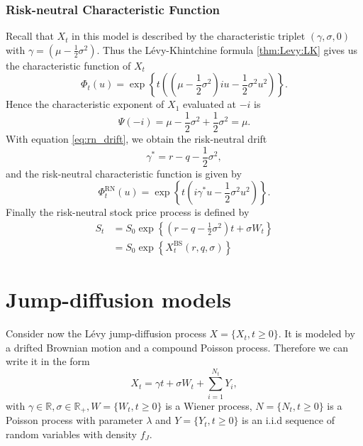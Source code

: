 \subsubsection*{Risk-neutral Characteristic Function}
Recall that $X_t$ in this model is described by the characteristic triplet $(\gamma, \sigma, 0)$ with $\gamma=\left(\mu-\frac{1}{2}\sigma^2\right)$. Thus the L\'evy-Khintchine formula \ref{thm:Levy:LK} gives us the characteristic function of $X_t$
$$\Phi_t(u)= \exp\left\{t\left(\left(\mu-\frac{1}{2}\sigma^2\right)iu -\frac{1}{2}\sigma^2 u^2\right)\right\}.$$
Hence the characteristic exponent of $X_1$ evaluated at $-i$ is
$$ \Psi(-i) = \mu -\frac{1}{2}\sigma^2+\frac{1}{2}\sigma^2 =\mu .$$
With equation \eqref{eq:rn_drift}, we obtain the risk-neutral drift
$$\gamma^\ast = r-q-\frac{1}{2}\sigma^2,$$
and the risk-neutral characteristic function is given by
$$\Phi_t^{\text{RN}}(u) = \exp\left\{t\left(i\gamma^\ast u -\frac{1}{2}\sigma^2u^2\right)\right\}.$$
Finally the risk-neutral stock price process is defined by
\begin{align*}
S_t&=S_0\exp\left\{\left(r-q-\frac{1}{2}\sigma^2\right)t+\sigma W_t\right\}\\
&=S_0\exp\left\{X_t^\text{BS}(r,q,\sigma)\right\}
\end{align*}
\section{Jump-diffusion models}
\label{sec:models:jump_diffusion}

Consider now the L\'evy jump-diffusion process $X=\{X_t,t\geq0\}$. It is modeled by a drifted Brownian motion and a compound Poisson process. Therefore we can write it in the form
$$X_t = \gamma t +\sigma W_t +\sum_{i=1}^{N_t}Y_i,$$
with $\gamma \in \mathbb{R}, \sigma \in \mathbb{R}_+, W = \{W_t,t\geq0\}$ is a Wiener process, $N =\{N_t,t\geq0\}$ is a Poisson process with parameter $\lambda$ and $Y=\{Y_t,t\geq0\}$ is an i.i.d sequence of random variables with density $f_J$.

